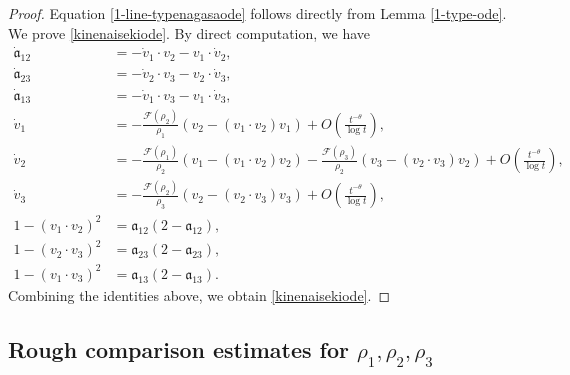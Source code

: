 \documentclass[10pt,a4paper]{amsart}
\numberwithin{equation}{section}
\begin{document}
\begin{proof}
Equation \eqref{1-line-typenagasaode} follows directly from Lemma \ref{1-type-ode}. We prove \eqref{kinenaisekiode}. By direct computation, we have
\begin{align*}
\dot{\mathfrak{a}}_{12}&=-\dot{v}_1\cdot v_2-v_1\cdot \dot{v}_2,
\\
\dot{\mathfrak{a}}_{23}&=-\dot{v}_2\cdot v_3-v_2\cdot \dot{v}_3,
\\
\dot{\mathfrak{a}}_{13}&=-\dot{v}_1\cdot v_3-v_1\cdot \dot{v}_3,
\\
\dot{v}_1&=-\frac{\mathcal{F}(\rho_2)}{\rho_1}\left(v_2-(v_1\cdot v_2)v_1\right)+O\left(\frac{t^{-\theta}}{\log{t}}\right),
\\
\dot{v}_2&=-\frac{\mathcal{F}(\rho_1)}{\rho_2}\left(v_1-(v_1\cdot v_2)v_2\right)-\frac{\mathcal{F}(\rho_3)}{\rho_2}\left(v_3-(v_2\cdot v_3)v_2\right)+O\left(\frac{t^{-\theta}}{\log{t}}\right),
\\
\dot{v}_3&=-\frac{\mathcal{F}(\rho_2)}{\rho_3}\left(v_2-(v_2\cdot v_3)v_3\right)+O\left(\frac{t^{-\theta}}{\log{t}}\right),
\\
1-\left(v_1\cdot v_2\right)^2&=\mathfrak{a}_{12}(2-\mathfrak{a}_{12}),
\\
1-\left(v_2\cdot v_3\right)^2&=\mathfrak{a}_{23}(2-\mathfrak{a}_{23}),
\\
1-\left(v_1\cdot v_3\right)^2&=\mathfrak{a}_{13}(2-\mathfrak{a}_{13}).
\end{align*}
Combining the identities above, we obtain \eqref{kinenaisekiode}.

\end{proof}


\subsection{Rough comparison estimates for $\rho_1,\rho_2,\rho_3$}
\end{document}
